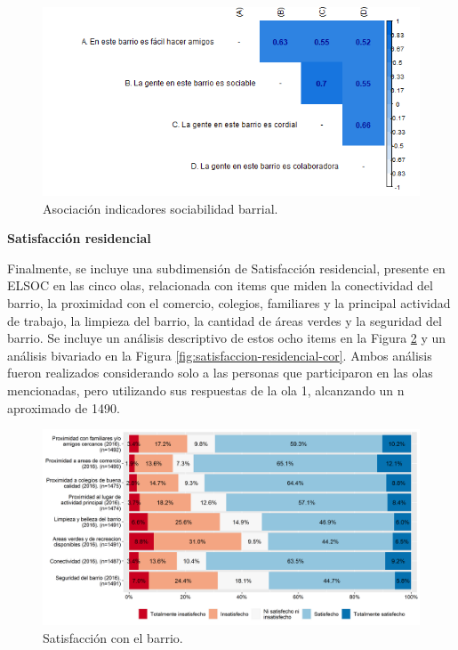 \documentclass[
  12pt,
]{book}
\begin{document}
\begin{figure}[H]

{\centering \includegraphics[width=1\linewidth,height=1\textheight]{output/graphs/sociabilidad-barrial_cor} 

}

\caption{Asociación indicadores sociabilidad barrial.}\label{fig:sociabilidad-barrial-cor}
\end{figure}

\textbf{Satisfacción residencial}

Finalmente, se incluye una subdimensión de Satisfacción residencial, presente en ELSOC en las cinco olas, relacionada con items que miden la conectividad del barrio, la proximidad con el comercio, colegios, familiares y la principal actividad de trabajo, la limpieza del barrio, la cantidad de áreas verdes y la seguridad del barrio. Se incluye un análisis descriptivo de estos ocho items en la Figura \ref{fig:satisfaccion-residencial} y un análisis bivariado en la Figura \ref{fig:satisfaccion-residencial-cor}. Ambos análisis fueron realizados considerando solo a las personas que participaron en las olas mencionadas, pero utilizando sus respuestas de la ola 1, alcanzando un n aproximado de 1490.

\begin{figure}[H]

{\centering \includegraphics[width=1\linewidth,height=1\textheight]{output/graphs/satisfaccion-residencial} 

}

\caption{Satisfacción con el barrio.}\label{fig:satisfaccion-residencial}
\end{figure}
\end{document}

